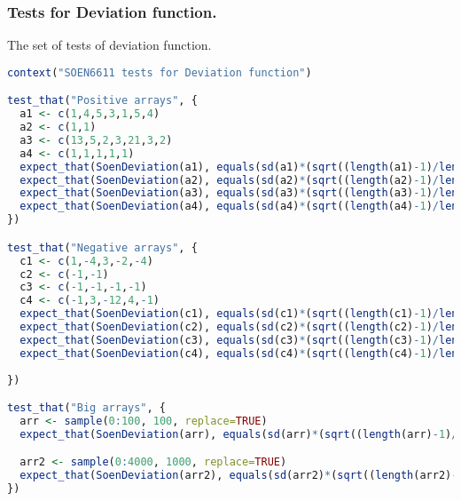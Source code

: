 \documentclass[12pt]{article}
\begin{document}
\subsubsection{Tests for Deviation function.}
The set of tests of deviation function.
\begin{lstlisting}[language=R]
context("SOEN6611 tests for Deviation function")

test_that("Positive arrays", {
  a1 <- c(1,4,5,3,1,5,4)
  a2 <- c(1,1)
  a3 <- c(13,5,2,3,21,3,2)
  a4 <- c(1,1,1,1,1)
  expect_that(SoenDeviation(a1), equals(sd(a1)*(sqrt((length(a1)-1)/length(a1)))))
  expect_that(SoenDeviation(a2), equals(sd(a2)*(sqrt((length(a2)-1)/length(a2)))))
  expect_that(SoenDeviation(a3), equals(sd(a3)*(sqrt((length(a3)-1)/length(a3)))))
  expect_that(SoenDeviation(a4), equals(sd(a4)*(sqrt((length(a4)-1)/length(a4)))))
})

test_that("Negative arrays", {
  c1 <- c(1,-4,3,-2,-4)
  c2 <- c(-1,-1)
  c3 <- c(-1,-1,-1,-1)
  c4 <- c(-1,3,-12,4,-1)
  expect_that(SoenDeviation(c1), equals(sd(c1)*(sqrt((length(c1)-1)/length(c1)))))
  expect_that(SoenDeviation(c2), equals(sd(c2)*(sqrt((length(c2)-1)/length(c2)))))
  expect_that(SoenDeviation(c3), equals(sd(c3)*(sqrt((length(c3)-1)/length(c3)))))
  expect_that(SoenDeviation(c4), equals(sd(c4)*(sqrt((length(c4)-1)/length(c4)))))
  
})

test_that("Big arrays", {
  arr <- sample(0:100, 100, replace=TRUE)
  expect_that(SoenDeviation(arr), equals(sd(arr)*(sqrt((length(arr)-1)/length(arr)))))

  arr2 <- sample(0:4000, 1000, replace=TRUE)
  expect_that(SoenDeviation(arr2), equals(sd(arr2)*(sqrt((length(arr2)-1)/length(arr2)))))
})
\end{lstlisting}

\end{document}
